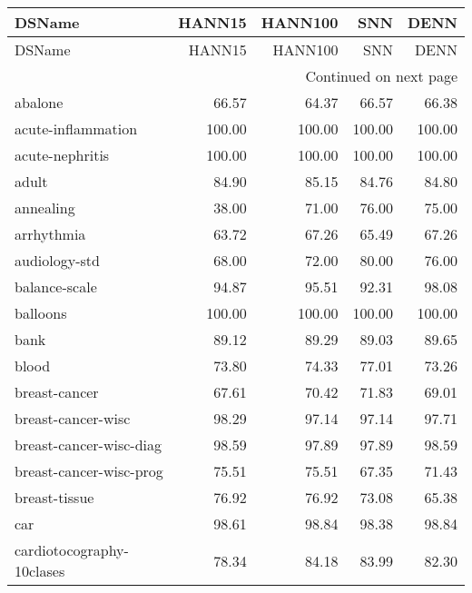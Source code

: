 \begin{longtable}{lrrrr}
\toprule
                        DSName &  HANN15 &  HANN100 &    SNN &   DENN \\
\midrule
\endfirsthead

\toprule
                        DSName &  HANN15 &  HANN100 &    SNN &   DENN \\
\midrule
\endhead
\midrule
\multicolumn{5}{r}{{Continued on next page}} \\
\midrule
\endfoot

\bottomrule
\endlastfoot
                       abalone &   66.57 &    64.37 &  66.57 &  66.38 \\
            acute-inflammation &  100.00 &   100.00 & 100.00 & 100.00 \\
               acute-nephritis &  100.00 &   100.00 & 100.00 & 100.00 \\
                         adult &   84.90 &    85.15 &  84.76 &  84.80 \\
                     annealing &   38.00 &    71.00 &  76.00 &  75.00 \\
                    arrhythmia &   63.72 &    67.26 &  65.49 &  67.26 \\
                 audiology-std &   68.00 &    72.00 &  80.00 &  76.00 \\
                 balance-scale &   94.87 &    95.51 &  92.31 &  98.08 \\
                      balloons &  100.00 &   100.00 & 100.00 & 100.00 \\
                          bank &   89.12 &    89.29 &  89.03 &  89.65 \\
                         blood &   73.80 &    74.33 &  77.01 &  73.26 \\
                 breast-cancer &   67.61 &    70.42 &  71.83 &  69.01 \\
            breast-cancer-wisc &   98.29 &    97.14 &  97.14 &  97.71 \\
       breast-cancer-wisc-diag &   98.59 &    97.89 &  97.89 &  98.59 \\
       breast-cancer-wisc-prog &   75.51 &    75.51 &  67.35 &  71.43 \\
                 breast-tissue &   76.92 &    76.92 &  73.08 &  65.38 \\
                           car &   98.61 &    98.84 &  98.38 &  98.84 \\
     cardiotocography-10clases &   78.34 &    84.18 &  83.99 &  82.30 \\

\end{longtable}
